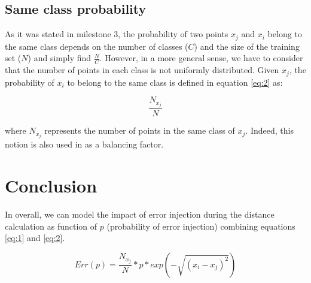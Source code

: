 \documentclass{article}
\begin{document}
\subsection{Same class probability}
As it was stated in milestone 3, the probability of two points $x_j$ and $x_i$ belong to the same class depends on the number of classes ($C$) and the size of the training set ($N$) and simply find $\frac{N}{C}$.  However, in a more general sense, we have to consider that the number of points in each class is not uniformly distributed.  Given $x_j$, the probability of $x_i$ to belong to the same class is defined in equation \ref{eq:2} as:

\begin{equation}\label{eq:2}
 \frac{N_{x_j}}{N}
\end{equation}

where $N_{x_j}$ represents the number of points in the same class of $x_j$.  Indeed, this notion is also used in \cite{song_iknn:_2007} as a balancing factor.

\section{Conclusion}
In overall, we can model the impact of error injection during the distance calculation as function of $p$ (probability of error injection) combining equations \ref{eq:1} and \ref{eq:2}.

\begin{equation}\label{eq:3}
 Err(p) = \frac{N_{x_j}}{N}*p*exp(-\sqrt{(x_i-x_j)^2})
\end{equation}




\end{document}
